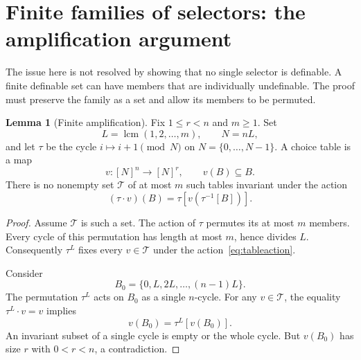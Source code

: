 \documentclass[11pt,letterpaper]{article}
\theoremstyle{definition}
\newtheorem{lemma}[definition]{Lemma}
\numberwithin{equation}{section}
\newcommand{\lcm}{\operatorname{lcm}}
\begin{document}
\section{Finite families of selectors: the amplification argument}\label{sec:families}

The issue here is not resolved by showing that no single selector is definable. A finite definable set can have members that are individually undefinable. The proof must preserve the family as a set and allow its members to be permuted.

\begin{lemma}[Finite amplification]\label{lem:amplification}
Fix $1\leq r<n$ and $m\geq1$. Set
\[
 L=\lcm(1,2,\ldots,m),\qquad N=nL,
\]
and let $\tau$ be the cycle $i\mapsto i+1\pmod N$ on $N=\{0,\ldots,N-1\}$. A choice table is a map
\[
 v:[N]^n\longrightarrow[N]^r,\qquad v(B)\subseteq B.
\]
There is no nonempty set $\mathcal T$ of at most $m$ such tables invariant under the action
\begin{equation}\label{eq:tableaction}
 (\tau\cdot v)(B)=\tau[v(\tau^{-1}[B])].
\end{equation}
\end{lemma}
\begin{proof}
Assume $\mathcal T$ is such a set. The action of $\tau$ permutes its at most $m$ members. Every cycle of this permutation has length at most $m$, hence divides $L$. Consequently $\tau^L$ fixes every $v\in\mathcal T$ under the action~\eqref{eq:tableaction}.

Consider
\[
 B_0=\{0,L,2L,\ldots,(n-1)L\}.
\]
The permutation $\tau^L$ acts on $B_0$ as a single $n$-cycle. For any $v\in\mathcal T$, the equality $\tau^L\cdot v=v$ implies
\[
 v(B_0)=\tau^L[v(B_0)].
\]
An invariant subset of a single cycle is empty or the whole cycle. But $v(B_0)$ has size $r$ with $0<r<n$, a contradiction.
\end{proof}
\end{document}
